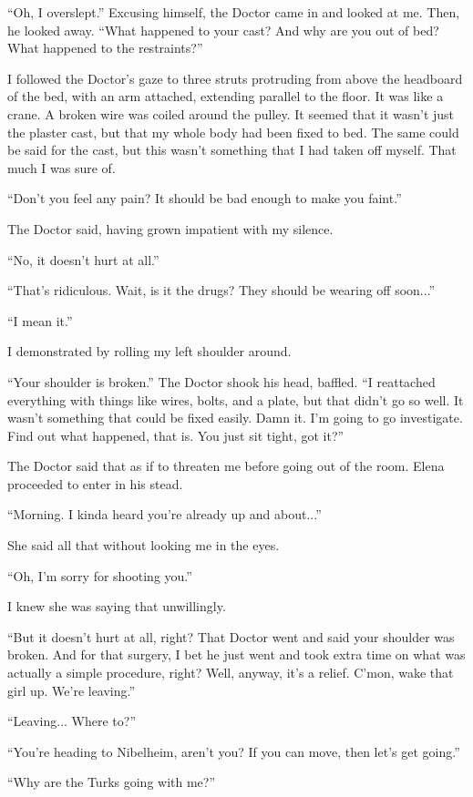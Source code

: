 \documentclass[oneside]{book}
\begin{document}
“Oh, I overslept.” Excusing himself, the Doctor came in and looked at me. Then, he looked away. “What happened to your cast? And why are you out of bed? What happened to the restraints?”

I followed the Doctor’s gaze to three struts protruding from above the headboard of the bed, with an arm attached, extending parallel to the floor. It was like a crane. A broken wire was coiled around the pulley. It seemed that it wasn’t just the plaster cast, but that my whole body had been fixed to bed. The same could be said for the cast, but this wasn’t something that I had taken off myself. That much I was sure of.

“Don’t you feel any pain? It should be bad enough to make you faint.”

The Doctor said, having grown impatient with my silence.

“No, it doesn’t hurt at all.”

“That’s ridiculous. Wait, is it the drugs? They should be wearing off soon...”

“I mean it.”

I demonstrated by rolling my left shoulder around.

“Your shoulder is broken.” The Doctor shook his head, baffled. “I reattached everything with things like wires, bolts, and a plate, but that didn’t go so well. It wasn’t something that could be fixed easily. Damn it. I’m going to go investigate. Find out what happened, that is. You just sit tight, got it?”

The Doctor said that as if to threaten me before going out of the room. Elena proceeded to enter in his stead.

“Morning. I kinda heard you’re already up and about...”

She said all that without looking me in the eyes.

“Oh, I’m sorry for shooting you.”

I knew she was saying that unwillingly.

“But it doesn’t hurt at all, right? That Doctor went and said your shoulder was broken. And for that surgery, I bet he just went and took extra time on what was actually a simple procedure, right? Well, anyway, it’s a relief. C’mon, wake that girl up. We’re leaving.”

“Leaving... Where to?”

“You’re heading to Nibelheim, aren’t you? If you can move, then let’s get going.”

“Why are the Turks going with me?”
\end{document}

